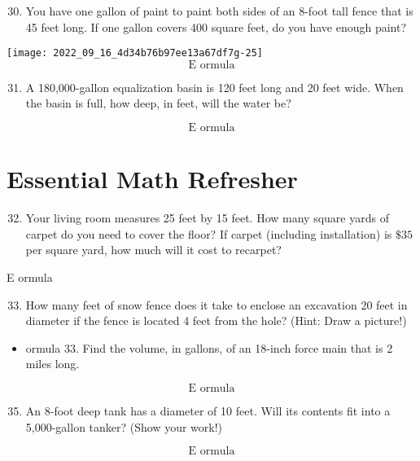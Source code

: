 \begin{enumerate}
\begin{enumerate}
  \setcounter{enumi}{29}
  \item You have one gallon of paint to paint both sides of an 8-foot tall fence that is 45 feet long. If one gallon covers 400 square feet, do you have enough paint?
\end{enumerate}
\texttt{[image: 2022\_09\_16\_4d34b76b97ee13a67df7g-25]}
$$
\text { E ormula }
$$

\begin{enumerate}
  \setcounter{enumi}{30}
  \item A 180,000-gallon equalization basin is 120 feet long and 20 feet wide. When the basin is full, how deep, in feet, will the water be?
\end{enumerate}
$$
\text { E ormula }
$$

\section{Essential Math Refresher}
\begin{enumerate}
  \setcounter{enumi}{31}
  \item Your living room measures 25 feet by 15 feet. How many square yards of carpet do you need to cover the floor? If carpet (including installation) is $\$ 35$ per square yard, how much will it cost to recarpet?
\end{enumerate}
E ormula

\begin{enumerate}
  \setcounter{enumi}{32}
  \item How many feet of snow fence does it take to enclose an excavation 20 feet in diameter if the fence is located 4 feet from the hole? (Hint: Draw a picture!)
\end{enumerate}
\begin{itemize}
  \item ormula 33. Find the volume, in gallons, of an 18-inch force main that is 2 miles long.
\end{itemize}
$$
\text { E ormula }
$$

\begin{enumerate}
  \setcounter{enumi}{34}
  \item An 8-foot deep tank has a diameter of 10 feet. Will its contents fit into a 5,000-gallon tanker? (Show your work!)
\end{enumerate}
$$
\text { E ormula }
$$

















\end{enumerate}
